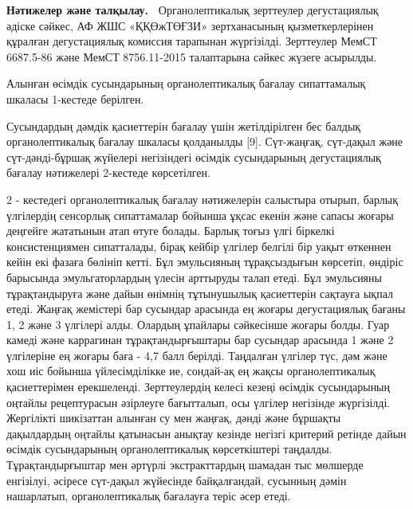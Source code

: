 \begin{multicols}{2}
{\bfseries Нәтижелер және талқылау.~} Органолептикалық зерттеулер
дегустациялық әдіске сәйкес, АФ ЖШС «ҚҚӨжТӨҒЗИ» зертханасының
қызметкерлерінен құралған дегустациялық комиссия тарапынан жүргізілді.
Зерттеулер МемСТ 6687.5-86 және МемСТ 8756.11-2015 талаптарына сәйкес
жүзеге асырылды.

Алынған өсімдік сусындарының органолептикалық бағалау сипаттамалық
шкаласы 1-кестеде берілген.

Сусындардың дәмдік қасиеттерін бағалау үшін жетілдірілген бес балдық
органолептикалық бағалау шкаласы қолданылды {[}9{]}. Сүт-жаңғақ,
сүт-дақыл және сүт-дәнді-бұршақ жүйелері негізіндегі өсімдік
сусындарының дегустациялық бағалау нәтижелері 2-кестеде көрсетілген.

2 - кестедегі органолептикалық бағалау нәтижелерін салыстыра отырып,
барлық үлгілердің сенсорлық сипаттамалар бойынша ұқсас екенін және
сапасы жоғары деңгейге жататынын атап өтуге болады. Барлық тоғыз үлгі
біркелкі консистенциямен сипатталады, бірақ кейбір үлгілер белгілі бір
уақыт өткеннен кейін екі фазаға бөлініп кетті. Бұл эмульсияның
тұрақсыздығын көрсетіп, өндіріс барысында эмульгаторлардың үлесін
арттыруды талап етеді. Бұл эмульсияны тұрақтандыруға және дайын өнімнің
тұтынушылық қасиеттерін сақтауға ықпал етеді. Жаңғақ жемістері бар
сусындар арасында ең жоғары дегустациялық бағаны 1, 2 және 3 үлгілері
алды. Олардың ұпайлары сәйкесінше жоғары болды. Гуар камеді және
каррагинан тұрақтандырғыштары бар сусындар арасында 1 және 2 үлгілеріне
ең жоғары баға - 4,7 балл берілді. Таңдалған үлгілер түс, дәм және хош
иіс бойынша үйлесімділікке ие, сондай-ақ ең жақсы органолептикалық
қасиеттерімен ерекшеленді. Зерттеулердің келесі кезеңі өсімдік
сусындарының оңтайлы рецептурасын әзірлеуге бағытталып, осы үлгілер
негізінде жүргізілді. Жергілікті шикізаттан алынған су мен жаңғақ, дәнді
және бұршақты дақылдардың оңтайлы қатынасын анықтау кезінде негізгі
критерий ретінде дайын өсімдік сусындарының органолептикалық
көрсеткіштері таңдалды. Тұрақтандырғыштар мен әртүрлі экстракттардың
шамадан тыс мөлшерде енгізілуі, әсіресе сүт-дақыл жүйесінде
байқалғандай, сусынның дәмін нашарлатып, органолептикалық бағалауға
теріс әсер етеді.
\end{multicols}

